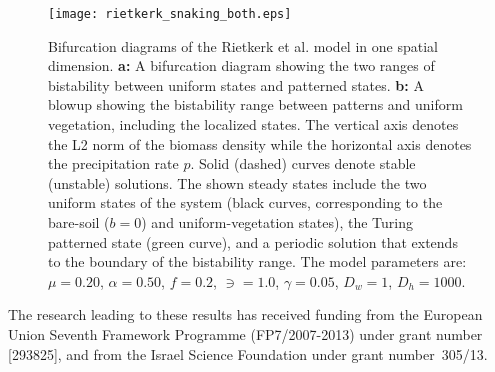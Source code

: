 \documentclass[aps,prl,preprint,superscriptaddress,floatfix]{revtex4-1}
\begin{document}
\begin{figure}
\texttt{[image: rietkerk\_snaking\_both.eps]}
\caption{
Bifurcation diagrams of the Rietkerk et al. model in one spatial dimension. 
\textbf{a:} A bifurcation diagram showing the two ranges of bistability between uniform states and patterned states. 
\textbf{b:} A blowup showing the bistability range between patterns and uniform vegetation, including the localized states. 
The vertical axis denotes the L2 norm of the biomass density while the horizontal axis denotes the precipitation rate $p$. 
Solid (dashed) curves denote stable (unstable) solutions. The shown steady states include the two uniform states of the system 
(black curves, corresponding to the bare-soil ($b=0$) and uniform-vegetation states), the Turing patterned state (green curve), 
and a periodic solution that extends to the boundary of the bistability range. 
The model parameters are: $\mu = 0.20$, $\alpha = 0.50$, $f = 0.2$, $\ni = 1.0$, $\gamma = 0.05$, $D_w = 1$, $D_h = 1000$.
\label{fig:Rsnaking}
}
\end{figure}


\begin{acknowledgments}
The research leading to these results has received funding from the European Union Seventh Framework Programme (FP7/2007-2013) under grant number [293825], and from the Israel Science Foundation under grant number~305/13.
\end{acknowledgments}


\end{document}
